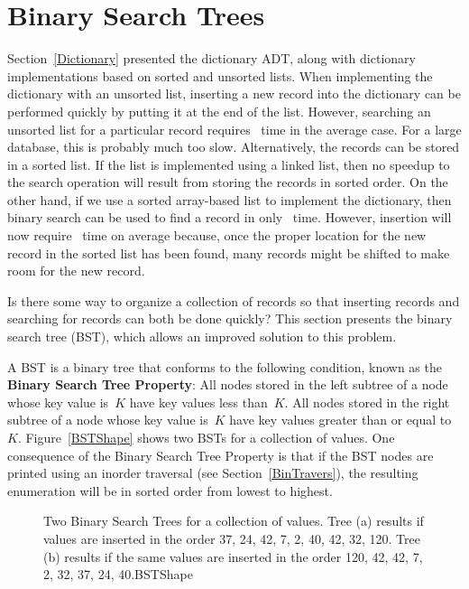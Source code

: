 \section{Binary Search Trees}
\label{BST}

Section~\ref{Dictionary} presented the
dictionary ADT, along with
dictionary implementations based on sorted and unsorted lists.
When implementing the dictionary with an unsorted list,
inserting a new record into the dictionary can be performed quickly by
putting it at the end of the list.
However, searching an unsorted list for a particular record
requires \Thetan\ time in the average case.
For a large database, this is probably much too slow.
Alternatively, the records can be stored in a sorted list.
If the list is implemented using a linked list, then no speedup to the
search operation will result from storing the records in sorted order.
On the other hand, if we use a sorted array-based list to implement
the dictionary, then binary search can be used to find a record in
only \Thetalogn\ time.
However, insertion will now require \Thetan\ time on average because,
once the proper location for the new record in the sorted list has
been found, many records might be shifted to make room for the new
record.

Is there some way to organize a collection of records so
that inserting records and searching for records can both be done
quickly?
This section presents the binary search tree (BST), 
which allows an improved solution to this problem.

A BST is a binary tree that conforms to the following condition, known 
as the {\bf Binary Search Tree Property}:
All nodes stored in the left
subtree of a node whose key value is~\(K\) have key values less
than~\(K\).
All nodes stored in the right subtree of a node whose key value
is~\(K\) have key values greater than or equal to~\(K\).
Figure~\ref{BSTShape} shows two BSTs for a collection of values.
One consequence of the Binary Search Tree Property is that if the BST
nodes are printed using an inorder traversal
(see Section~\ref{BinTravers}),
the resulting enumeration will be in
sorted order from lowest to highest.

\begin{figure}
\vspace{-\bigskipamount}
\vspace{-\medskipamount}
{Two Binary Search Trees for a collection of values.
Tree (a) results if values are inserted
in the order 37, 24, 42, 7, 2, 40, 42, 32, 120.
Tree (b) results if the same values are inserted in the
order 120, 42, 42, 7, 2, 32, 37, 24, 40.}{BSTShape}
\smallskip
\end{figure}

